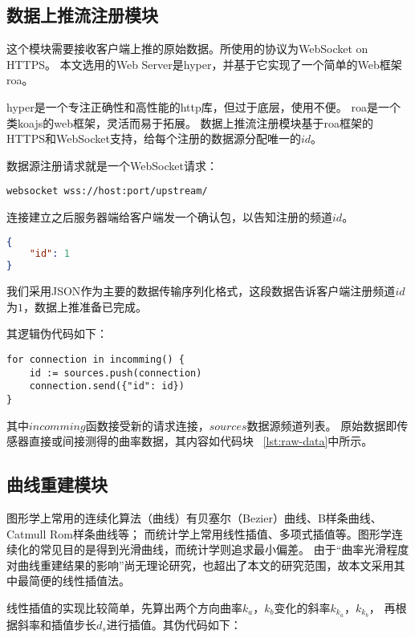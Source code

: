 \subsection{数据上推流注册模块}
这个模块需要接收客户端上推的原始数据。所使用的协议为WebSocket on HTTPS。
本文选用的Web Server是hyper\cite{hyper}，并基于它实现了一个简单的Web框架roa\cite{roa}。

hyper是一个专注正确性和高性能的http库，但过于底层，使用不便。
roa是一个类koajs\cite{koajs}的web框架，灵活而易于拓展。
数据上推流注册模块基于roa框架的HTTPS和WebSocket支持，给每个注册的数据源分配唯一的$id$。

数据源注册请求就是一个WebSocket请求：

\begin{lstlisting}[label={lst:register-source},caption={发起数据源注册请求}]
websocket wss://host:port/upstream/
\end{lstlisting}

连接建立之后服务器端给客户端发一个确认包，以告知注册的频道$id$。

\begin{lstlisting}[language=json,firstnumber=1,label={lst:register-resp},caption={数据源注册成功}]
{
    "id": 1
}
\end{lstlisting}

我们采用JSON\cite{rfc7159}作为主要的数据传输序列化格式，这段数据告诉客户端注册频道$id$为$1$，数据上推准备已完成。

其逻辑伪代码如下：

\begin{lstlisting}[caption={注册数据源}]
for connection in incomming() {
    id := sources.push(connection)
    connection.send({"id": id})
}
\end{lstlisting}

其中$incomming$函数接受新的请求连接，$sources$数据源频道列表。
原始数据即传感器直接或间接测得的曲率数据，其内容如代码块 ~\ref{lst:raw-data}中所示。

\subsection{曲线重建模块}
图形学上常用的连续化算法（曲线）有贝塞尔（Bezier）曲线、B样条曲线、Catmull Rom样条曲线等；
而统计学上常用线性插值、多项式插值等。图形学连续化的常见目的是得到光滑曲线，而统计学则追求最小偏差。
由于“曲率光滑程度对曲线重建结果的影响”尚无理论研究，也超出了本文的研究范围，故本文采用其中最简便的线性插值法。

线性插值的实现比较简单，先算出两个方向曲率$k_a$，$k_b$变化的斜率$k_{k_a}$，$k_{k_b}$，
再根据斜率和插值步长$d_s$进行插值。其伪代码如下：

